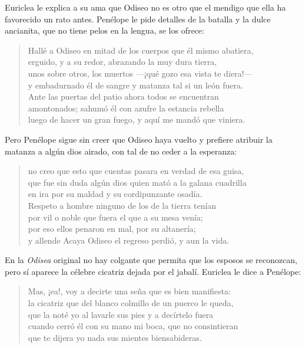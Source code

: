 Euriclea le explica a su ama que Odiseo no es otro que el mendigo que ella ha favorecido un rato antes. Penélope le pide detalles de la batalla y la dulce ancianita, que no tiene pelos en la lengua, se los ofrece:

\begin{verse}
Hallé a Odiseo en mitad de los cuerpos que él mismo abatiera,\\
erguido, y a su redor, abrazando la muy dura tierra,\\
unos sobre otros, los muertos ---¡qué gozo esa vista te diera!---\\
y embadurnado él de sangre y matanza tal si un león fuera.\\
Ante las puertas del patio ahora todos se encuentran\\
amontonados; sahumó él con azufre la estancia rebella\\
luego de hacer un gran fuego, y aquí me mandó que viniera.
\end{verse}

Pero Penélope sigue sin creer que Odiseo haya vuelto y prefiere atribuir la matanza a algún dios airado, con tal de no ceder a la esperanza:

\begin{verse}
no creo que esto que cuentas pasara en verdad de esa guisa,\\
que fue sin duda algún dios quien mató a la galana cuadrilla\\
en ira por su maldad y su cordipunzante osadía.\\
Respeto a hombre ninguno de los de la tierra tenían\\
por vil o noble que fuera el que a su mesa venía;\\
por eso ellos penaron en mal, por su altanería;\\
y allende Acaya Odiseo el regreso perdió, y aun la vida.
\end{verse}

En la \emph{Odisea} original no hay colgante que permita que los esposos se reconozcan, pero sí aparece la célebre cicatriz dejada por el jabalí. Euriclea le dice a Penélope:

\begin{verse}
Mas, ¡ea!, voy a decirte una seña que es bien manifiesta:\\
la cicatriz que del blanco colmillo de un puerco le queda,\\
que la noté yo al lavarle sus pies y a decírtelo fuera\\
cuando cerró él con su mano mi boca, que no consintieran\\
que te dijera yo nada sus mientes biensabideras.
\end{verse}

